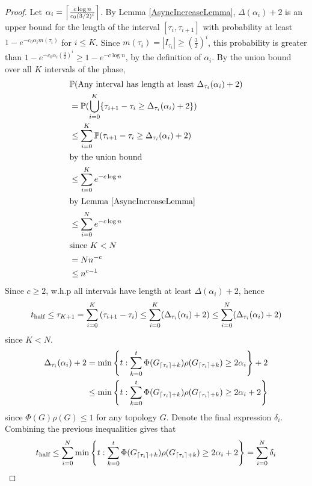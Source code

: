 \begin{proof}
	Let $\alpha_i = \ceil*{\frac{c \log n}{c_0 (3/2)^i}}$.
	By Lemma \ref{AsyncIncreaseLemma}, $\Delta(\alpha_i) + 2$ is an upper bound for the length of the interval $[\tau_i, \tau_{i+1}]$ 
	with probability at least $1 - e^{-c_0\alpha_i m(\tau_i)}$ for $i \leq K$.
	Since $m(\tau_i) = |I_{\tau_i}| \geq (\frac{3}{2})^i$, this probability is greater than $1 - e^{-c_0\alpha_i (\frac{3}{2})^i} \geq 1 - e^{-c \log n}$, by the definition of $\alpha_i$. By the union bound over all $K$ intervals of the phase,
	\begin{align*}
		& \mathbb{P}(\text{Any interval has length at least } \Delta_{\tau_i}(\alpha_i) + 2) \\
		&= \mathbb{P}(\bigcup_{i=0}^K \{\tau_{i+1} - \tau_i \geq \Delta_{\tau_i}(\alpha_i) + 2\}) \\
		&\leq \sum_{i=0}^K \mathbb{P}(\tau_{i+1} - \tau_i \geq \Delta_{\tau_i}(\alpha_i) + 2) \\
		\intertext{by the union bound}
		&\leq \sum_{i=0}^K e^{-c \log n} \\
		\intertext{by Lemma \ref{AsyncIncreaseLemma}}	
		&\leq \sum_{i=0}^N e^{-c \log n} \\
		\intertext{since $K < N$}
		&= N n^{-c} \\
		&\leq n^{c-1}
	\end{align*}
	Since $c \geq 2$, w.h.p all intervals have length at least $\Delta(\alpha_i) + 2$, hence
	\begin{equation}\label{eq:t_halfBound}
		t_\text{half} 
		\leq \tau_{K+1} 
		= \sum_{i=0}^K \lb \tau_{i+1} - \tau_i  \rb 
		\leq \sum_{i=0}^K (\Delta_{\tau_i}(\alpha_i) + 2) 
		\leq \sum_{i=0}^N (\Delta_{\tau_i}(\alpha_i) + 2) 
	\end{equation}
	since $K < N$.
	\begin{align*}
		\Delta_{\tau_i}(\alpha_i) + 2 
		&=
		\min \left\{t: \sum_{k=0}^t \Phi(G_{\ceil*{\tau_i}+k})\rho(G_{\ceil*{\tau_i}+k}) \geq 2 \alpha_i \right\} + 2 \\
		&\leq \min \left\{t: \sum_{k=0}^t \Phi(G_{\ceil*{\tau_i}+k})\rho(G_{\ceil*{\tau_i}+k}) \geq 2 \alpha_i + 2 \right\}
	\end{align*}
	since $\Phi(G)\rho(G) \leq 1$ for  any topology $G$. Denote the final expression $\delta_i$. Combining the previous inequalities gives that
	\begin{align*}
		t_\text{half} &\leq \sum_{i=0}^N \min \left\{t: \sum_{k=0}^t \Phi(G_{\ceil*{\tau_i}+k})\rho(G_{\ceil*{\tau_i}+k}) \geq 2 \alpha_i + 2 \right\} = \sum_{i=0}^N \delta_i \\

\end{align*}
\end{proof}
